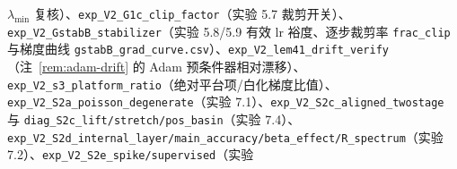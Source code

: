 \documentclass[fontset=windows,11pt]{ctexart}
\numberwithin{equation}{section}
\begin{document}
$\lambda_{\min}$ 复核）、\texttt{exp\_\hspace{0pt}V2\_\hspace{0pt}G1c\_\hspace{0pt}clip\_\hspace{0pt}factor}（实验 5.7 裁剪开关）、\texttt{exp\_\hspace{0pt}V2\_\hspace{0pt}GstabB\_\hspace{0pt}stabilizer}（实验 5.8/5.9 有效 lr 裕度、逐步裁剪率 \texttt{frac\_\hspace{0pt}clip} 与梯度曲线 \texttt{gstabB\_\hspace{0pt}grad\_\hspace{0pt}curve.csv}）、\texttt{exp\_\hspace{0pt}V2\_\hspace{0pt}lem41\_\hspace{0pt}drift\_\hspace{0pt}verify}（注~\ref{rem:adam-drift} 的 Adam 预条件器相对漂移）、\texttt{exp\_\hspace{0pt}V2\_\hspace{0pt}s3\_\hspace{0pt}platform\_\hspace{0pt}ratio}（绝对平台项/白化梯度比值）、\texttt{exp\_\hspace{0pt}V2\_\hspace{0pt}S2a\_\hspace{0pt}poisson\_\hspace{0pt}degenerate}（实验 7.1）、\texttt{exp\_\hspace{0pt}V2\_\hspace{0pt}S2c\_\hspace{0pt}aligned\_\hspace{0pt}twostage} 与 \texttt{diag\_\hspace{0pt}S2c\_\hspace{0pt}lift/\hspace{0pt}stretch/\hspace{0pt}pos\_\hspace{0pt}basin}（实验 7.4）、\texttt{exp\_\hspace{0pt}V2\_\hspace{0pt}S2d\_\hspace{0pt}internal\_\hspace{0pt}layer/\hspace{0pt}main\_\hspace{0pt}accuracy/\hspace{0pt}beta\_\hspace{0pt}effect/\hspace{0pt}R\_\hspace{0pt}spectrum}（实验 7.2）、\texttt{exp\_\hspace{0pt}V2\_\hspace{0pt}S2e\_\hspace{0pt}spike/\hspace{0pt}supervised}（实验 
\end{document}
